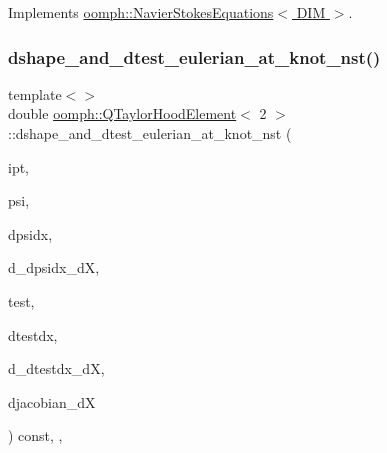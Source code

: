 Implements \hyperlink{classoomph_1_1NavierStokesEquations_afbc63afd804f5143c74b0ca1be76ef82}{oomph\+::\+Navier\+Stokes\+Equations$<$ D\+I\+M $>$}.

\mbox{\label{classoomph_1_1QTaylorHoodElement_abdb8ec3adc8877c83442269528f51ac3}} 
\subsubsection{\texorpdfstring{dshape\+\_\+and\+\_\+dtest\+\_\+eulerian\+\_\+at\+\_\+knot\+\_\+nst()}{dshape\_and\_dtest\_eulerian\_at\_knot\_nst()}\hspace{0.1cm}{\footnotesize\ttfamily [3/4]}}
{\footnotesize\ttfamily template$<$$>$ \\
double \hyperlink{classoomph_1_1QTaylorHoodElement}{oomph\+::\+Q\+Taylor\+Hood\+Element}$<$ 2 $>$\+::dshape\+\_\+and\+\_\+dtest\+\_\+eulerian\+\_\+at\+\_\+knot\+\_\+nst (\begin{DoxyParamCaption}\item[{const unsigned \&}]{ipt,  }\item[{\hyperlink{classoomph_1_1Shape}{Shape} \&}]{psi,  }\item[{\hyperlink{classoomph_1_1DShape}{D\+Shape} \&}]{dpsidx,  }\item[{\hyperlink{classoomph_1_1RankFourTensor}{Rank\+Four\+Tensor}$<$ double $>$ \&}]{d\+\_\+dpsidx\+\_\+dX,  }\item[{\hyperlink{classoomph_1_1Shape}{Shape} \&}]{test,  }\item[{\hyperlink{classoomph_1_1DShape}{D\+Shape} \&}]{dtestdx,  }\item[{\hyperlink{classoomph_1_1RankFourTensor}{Rank\+Four\+Tensor}$<$ double $>$ \&}]{d\+\_\+dtestdx\+\_\+dX,  }\item[{\hyperlink{classoomph_1_1DenseMatrix}{Dense\+Matrix}$<$ double $>$ \&}]{djacobian\+\_\+dX }\end{DoxyParamCaption}) const\hspace{0.3cm}{\ttfamily [inline]}, {\ttfamily [protected]}, {\ttfamily [virtual]}}

